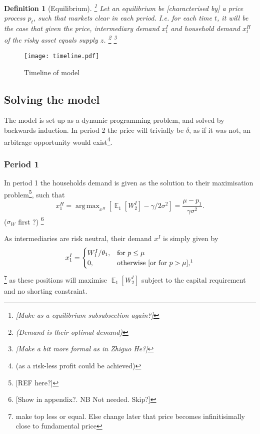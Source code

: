 \documentclass[11pt]{article}
\DeclareMathOperator{\E}{\mathbb{E}} %
\newtheorem{definition}{Definition}%
\DeclareMathOperator*{\argmax}{arg\,max} %
\begin{document}
\begin{definition}[Equilibrium] \label{d_eqm}
\footnote{[Make as a equilibrium subsubsection again?]} Let an equilibrium be [characterised by] a price process $p_t$, such that markets clear in each period. I.e. for each time $t$, it will be the case that given the price, intermediary demand $x^I_t$ and household demand $x^H_t$ of the risky asset equals supply $z$. \footnote{(Demand is their optimal demand)} \footnote{[Make a bit more formal as in Zhiguo He?]}
\end{definition}



\begin{figure}[h]
\centering
\texttt{[image: timeline.pdf]}
\caption{Timeline of model}
\label{fig:timeline}
\end{figure}


\subsection*{Solving the model}
The model is set up as a dynamic programming problem, and solved by backwards induction. In period 2 the price will trivially be $\delta$, as if it was not, an arbitrage opportunity would exist\footnote{(as a risk-less profit could be achieved)}.

\subsubsection*{Period 1}
In period 1 the households demand is given as the solution to their maximisation problem\footnote{[REF here?]}, such that
\begin{equation} \label{e_xH}
x^{H}_1 = \argmax_{x^H}\left[\E_1[W^I_2] - \gamma/2\sigma^2\right]
= \frac{\mu - p_1}{\gamma\sigma^2}.
\end{equation}
($\sigma_W$ first ?)
\footnote{[Show in appendix?. NB Not needed. Skip?]}


As intermediaries are risk neutral, their demand $x^I$ is simply given by
\begin{equation}  \label{e_xI}
x^I_1 = \begin{cases}
 W^I_1/\theta_1, &\text{for $p \leq \mu$}\\
 0, &\text{otherwise [or for $p > \mu$],\footnotemark}
\end{cases}
\end{equation}
 \footnote{make top less or equal. Else change later that price becomes infinitisimally close to fundamental price}
\noindent as these positions will maximise $\E_1[W^I_2]$ subject to the capital requirement and no shorting constraint.
\end{document}
